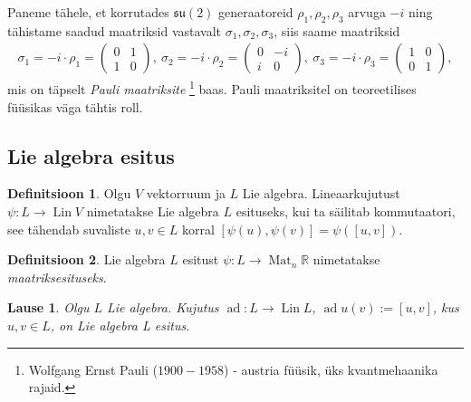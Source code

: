 \documentclass[12pt]{article}
\theoremstyle{plain}
\newtheorem{lause}{Lause}[section]
\theoremstyle{definition}
\newtheorem{definitsioon}{Definitsioon}[section]
\numberwithin{equation}{section}
\def\R{{\mathbb R}}
\def\su2{{\mathfrak{ su}\left(2\right)}}
\DeclareMathOperator{\Mat}{Mat}
\DeclareMathOperator{\ad}{ad}
\DeclareMathOperator{\Lin}{Lin}
\begin{document}
Paneme tähele, et korrutades $\su2$ generaatoreid 
$\rho_1, \rho_2, \rho_3$ arvuga $-i$ ning tähistame saadud 
maatriksid vastavalt $\sigma_1, \sigma_2, \sigma_3$, siis saame 
maatriksid
\begin{align*}
\sigma_1 = -i \cdot \rho_1 = 
\begin{pmatrix} 0 & 1 \\ 1 & 0 \end{pmatrix}, \ 
\sigma_2 = -i \cdot \rho_2 = 
\begin{pmatrix} 0 & -i \\ i & 0 \end{pmatrix},\ 
\sigma_3 = -i \cdot \rho_3 = 
\begin{pmatrix} 1 & 0 \\ 0 & 1 \end{pmatrix},
\end{align*}
mis on täpselt \emph{Pauli maatriksite}
\footnote{Wolfgang Ernst Pauli ($1900 - 1958$) - austria füüsik, 
üks kvantmehaanika rajaid.} baas. Pauli maatriksitel on 
teoreetilises füüsikas väga tähtis roll.

\subsection{Lie algebra esitus}

\begin{definitsioon}
Olgu $V$ vektorruum ja $L$ Lie algebra. Lineaarkujutust 
$\psi : L \rightarrow \Lin V$ nimetatakse Lie algebra $L$ esituseks, 
kui ta säilitab kommutaatori, see tähendab suvaliste $u, v \in L$ 
korral $\left[\psi\left(u\right), \psi\left(v\right)\right] = 
\psi\left(\left[u, v\right]\right)$. 
\end{definitsioon}

\begin{definitsioon}
Lie algebra $L$ esitust $\psi : L \rightarrow \Mat_n \R$ nimetatakse 
\emph{maatriksesituseks}.
\end{definitsioon}

\begin{lause} \label{lause:adjoint}
Olgu $L$ Lie algebra. Kujutus $\ad : L \rightarrow \Lin L$, 
$\ad u \left(v\right) := \left[u, v\right]$, kus $u,v \in L$, 
on Lie algebra L esitus.
\end{lause}
\end{document}
